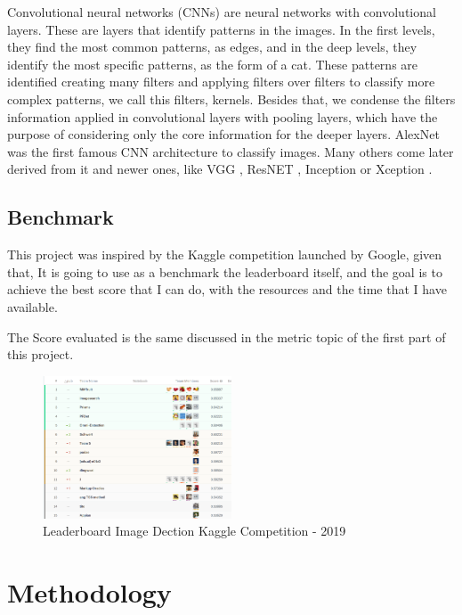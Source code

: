 \documentclass[11pt, a4paper, twocolumn]{article}
\begin{document}
Convolutional neural networks (CNNs) are neural networks with convolutional layers. These are layers that identify patterns in the images. In the first levels, they find the most common patterns, as edges, and in the deep levels, they identify the most specific patterns, as the form of a cat. These patterns are identified creating many filters and applying filters over filters to classify more complex patterns, we call this filters, kernels. Besides that, we condense the filters information applied in convolutional layers with pooling layers, which have the purpose of considering only the core information for the deeper layers. \cite{cnn:1} AlexNet \cite{AlexNet} was the first famous CNN architecture to classify images. Many others come later derived from it and newer ones, like VGG \cite{vgg}, ResNET \cite{resnet}, Inception \cite{inception} or Xception \cite{xception}.

\subsection{Benchmark}

This project was inspired by the Kaggle competition launched by Google, given that, It is going to use as a benchmark the leaderboard itself, \cite{leaderboard} and the goal is to achieve the best score that I can do, with the resources and the time that I have available.

The Score evaluated is the same discussed in the metric topic of the first part of this project. 

\begin{figure}[!ht]
	\centering
	\includegraphics[width=0.5\textwidth]{leaderboard.png}
	\caption{\scriptsize Leaderboard Image Dection Kaggle Competition - 2019}
\end{figure}

\section{Methodology}
\end{document}
